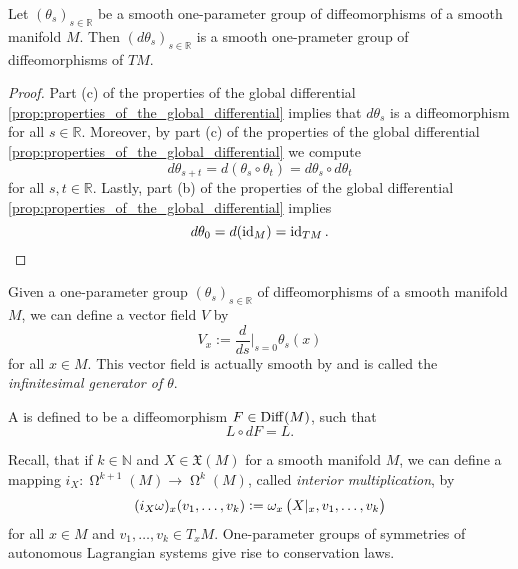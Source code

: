 \begin{lemma}
	\label{lem:induced_one-parameter_group_of_diffeomorphisms}
	Let $(\theta_s)_{s \in \mathbb{R}}$ be a smooth one-parameter group of diffeomorphisms of a smooth manifold $M$. Then $(d\theta_s)_{s \in \mathbb{R}}$ is a smooth one-prameter group of diffeomorphisms of $TM$.
\end{lemma}

\begin{proof}
	Part (c) of the properties of the global differential \ref{prop:properties_of_the_global_differential} implies that $d\theta_s$ is a diffeomorphism for all $s \in \mathbb{R}$. Moreover, by part (c) of the properties of the global differential \ref{prop:properties_of_the_global_differential} we compute
	\begin{equation*}
		d\theta_{s + t} = d(\theta_s \circ \theta_t) = d\theta_s \circ d\theta_t
	\end{equation*}
	\noindent for all $s,t \in \mathbb{R}$. Lastly, part (b) of the properties of the global differential \ref{prop:properties_of_the_global_differential} implies
	\begin{equation*}
		d\theta_0 = d(\operatorname{id}_M) = \operatorname{id}_{TM}.
	\end{equation*}
\end{proof}

Given a one-parameter group $(\theta_s)_{s \in \mathbb{R}}$ of diffeomorphisms of a smooth manifold $M$, we can define a vector field $V$ by
\begin{equation*}
	V_x := \frac{d}{ds}\bigg\vert_{s = 0} \theta_s(x)
\end{equation*}
\noindent for all $x \in M$. This vector field is actually smooth by \cite[210]{lee:smooth_manifolds:2013} and is called the \emph{infinitesimal generator of $\theta$}.

\begin{definition}[Symmetry]
	A  is defined to be a diffeomorphism $F \in \operatorname{Diff}(M)$, such that
	\begin{equation*}
		L \circ dF = L.
	\end{equation*}
\end{definition}

Recall, that if $k \in \mathbb{N}$ and $X \in \mathfrak{X}(M)$ for a smooth manifold $M$, we can define a mapping $i_X : \upOmega^{k + 1}(M) \to \upOmega^k(M)$, called \emph{interior multiplication}, by
\begin{equation*}
	(i_X\omega)_x(v_1,\dots,v_k) := \omega_x\del[1]{X\vert_x,v_1,\dots,v_k}
\end{equation*}
\noindent for all $x \in M$ and $v_1,\dots,v_k \in T_xM$. One-parameter groups of symmetries of autonomous Lagrangian systems give rise to conservation laws. 

